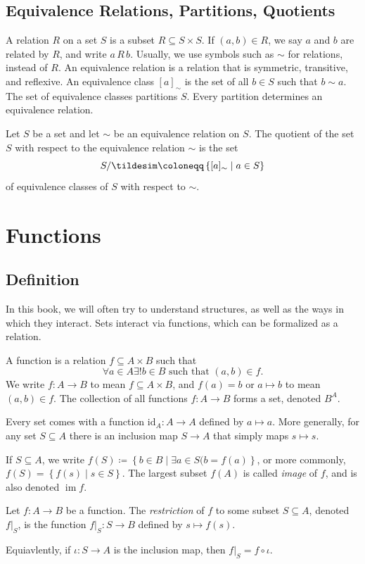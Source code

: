 \subsection{Equivalence Relations, Partitions, Quotients}
A relation $R$ on a set $S$ is a subset $R\subseteq S\times S$. If $(a,b)\in R$, we say $a$ and $b$ are related by $R$, and write $a\,R\,b$. Usually, we use symbols such as $\sim $ for relations, instead of $R$. An equivalence relation is a relation that is symmetric, transitive, and reflexive. An equivalence class $[a]_\sim $ is the set of all $b\in S$ such that $b\sim a$. The set of equivalence classes partitions $S$. Every partition determines an equivalence relation.
\begin{definition}\label{dfn:1.1.9}
	Let $S$ be a set and let $\sim $ be an equivalence relation on $S$. The quotient of the set $S$ with respect to the equivalence relation $\sim $ is the set
	\[
		S /\tildesim \coloneqq \left\{ [a]_\sim  \mid a\in S \right\} 
	\]
	of equivalence classes of $S$ with respect to $\sim $.
\end{definition}
\section{Functions}
\subsection{Definition}
In this book, we will often try to understand structures, as well as the ways in which they interact. Sets interact via functions, which can be formalized as a relation.
\begin{definition}[Function]\label{dfn:1.2.1}
	A function is a relation $f\subseteq A\times B$ such that
	\[
		\forall a\in A\exists !b\in B \text{ such that } (a,b)\in f
	.\]
	We write $f : A \to B$ to mean $f\subseteq A\times B$, and $f(a)=b$ or $a\mapsto b$ to mean $(a,b)\in f$. The collection of all functions $f : A \to B$ forms a set, denoted $B^A$.
\end{definition}
Every set comes with a function $\mathrm{id}_A : A \to A$ defined by $a\mapsto a$. More generally, for any set $S\subseteq A$ there is an inclusion map $S\to A$ that simply maps $s\mapsto s$.

If $S\subseteq A$, we write $f(S)\coloneqq \left\{ b\in B \mid \exists a\in S(b=f(a) \right\} $, or more commonly, $f(S)=\left\{ f(s) \mid s\in S \right\} $. The largest subset $f(A)$ is called \emph{image} of $f$, and is also denoted $\operatorname{im}f $.
\begin{definition}[Restriction]\label{dfn:1.2.2}
	Let $f : A \to B$ be a function. The \emph{restriction} of $f$ to some subset $S\subseteq A$, denoted $f|_S$, is the function $f|_S : S \to B$ defined by $s\mapsto f(s)$.
\end{definition}
Equiavlently, if $\iota : S \to A$ is the inclusion map, then $f|_S=f\circ \iota $.
